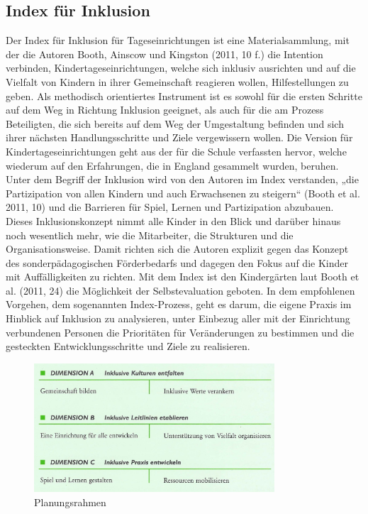 \subsection{Index für Inklusion}
Der Index für Inklusion für Tageseinrichtungen ist eine Materialsammlung, mit der die Autoren Booth, Ainscow und Kingston (2011, 10 f.) die Intention verbinden, Kindertageseinrichtungen, welche sich inklusiv ausrichten und auf die Vielfalt von Kindern in ihrer Gemeinschaft reagieren wollen, Hilfestellungen zu geben. Als methodisch orientiertes Instrument ist es sowohl für die ersten Schritte auf dem Weg in Richtung Inklusion geeignet, als auch für die am Prozess Beteiligten, die sich bereits auf dem Weg der Umgestaltung befinden und sich ihrer nächsten Handlungsschritte und Ziele vergewissern wollen.
Die Version für Kindertageseinrichtungen geht aus der für die Schule verfassten hervor, welche wiederum auf den Erfahrungen, die in England gesammelt wurden, beruhen. Unter dem Begriff der Inklusion wird von den Autoren im Index verstanden, „die Partizipation von allen Kindern und auch Erwachsenen zu steigern“ (Booth et al. 2011, 10) und die Barrieren für Spiel, Lernen und Partizipation abzubauen. Dieses Inklusionskonzept nimmt alle Kinder in den Blick und darüber hinaus noch wesentlich mehr, wie die Mitarbeiter, die Strukturen und die Organisationsweise. Damit richten sich die Autoren explizit gegen das Konzept des sonderpädagogischen Förderbedarfs und dagegen den Fokus auf  die Kinder mit Auffälligkeiten zu richten.
Mit dem Index ist den Kindergärten laut Booth et al. (2011, 24) die Möglichkeit der Selbstevaluation geboten. In dem empfohlenen Vorgehen, dem sogenannten Index-Prozess, geht es darum, die eigene Praxis im Hinblick auf Inklusion zu analysieren, unter Einbezug aller mit der Einrichtung verbundenen Personen die Prioritäten für Veränderungen zu bestimmen und die gesteckten Entwicklungsschritte und Ziele zu realisieren. 

\begin{figure}
  \centering
  \label{pic:planungsrahmen}
  \includegraphics[width=0.8\textwidth]{bilder/planungsrahmen}
  \caption{Planungsrahmen}
\end{figure}

